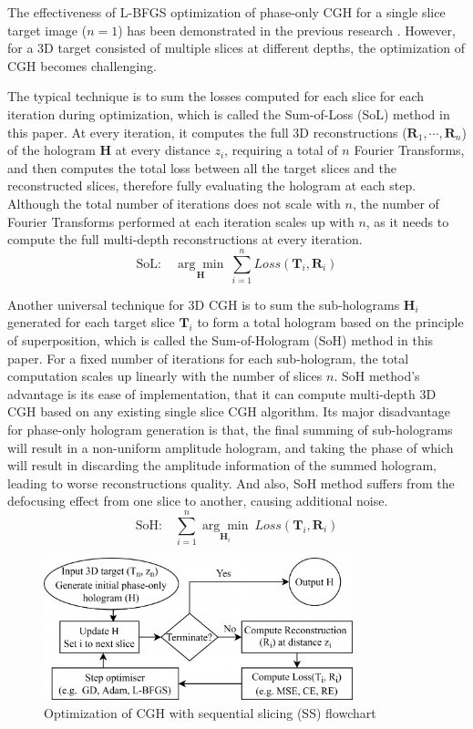 The effectiveness of L-BFGS optimization of phase-only CGH for a single slice target image ($n=1$) has been demonstrated in the previous research \cite{Sha2022}. However, for a 3D target consisted of multiple slices at different depths, the optimization of CGH becomes challenging.

The typical technique is to sum the losses computed for each slice for each iteration during optimization, which is called the Sum-of-Loss (SoL) method in this paper. At every iteration, it computes the full 3D reconstructions ($\textbf{R}_1, \cdots, \textbf{R}_n$) of the hologram $\textbf{H}$ at every distance $z_i$, requiring a total of $n$ Fourier Transforms, and then computes the total loss between all the target slices and the reconstructed slices, therefore fully evaluating the hologram at each step. Although the total number of iterations does not scale with $n$, the number of Fourier Transforms performed at each iteration scales up with $n$, as it needs to compute the full multi-depth reconstructions at every iteration.
\begin{equation}
	\text{SoL:}\quad \underset{\textbf{H}}{\arg \min}\ \sum_{i = 1}^{n} Loss(\textbf{T}_i, \textbf{R}_i)
\end{equation}

Another universal technique for 3D CGH is to sum the sub-holograms $\textbf{H}_i$ generated for each target slice $\textbf{T}_i$ to form a total hologram based on the principle of superposition, which is called the Sum-of-Hologram (SoH) method in this paper. For a fixed number of iterations for each sub-hologram, the total computation scales up linearly with the number of slices $n$. SoH method's advantage is its ease of implementation, that it can compute multi-depth 3D CGH based on any existing single slice CGH algorithm. Its major disadvantage for phase-only hologram generation is that, the final summing of sub-holograms will result in a non-uniform amplitude hologram, and taking the phase of which will result in discarding the amplitude information of the summed hologram, leading to worse reconstructions quality. And also, SoH method suffers from the defocusing effect from one slice to another, causing additional noise.
\begin{equation}
	\text{SoH:}\quad \sum_{i = 1}^{n} \underset{\textbf{H}_i}{\arg \min}\ Loss(\textbf{T}_i, \textbf{R}_i)
\end{equation}

\begin{figure}[h!]
	\centering
	\includegraphics[width=0.8\textwidth]{optim3d-cgh-flowchart}
	\caption{Optimization of CGH with sequential slicing (SS) flowchart}
	\label{fig:optim3d-cgh-flowchart}
\end{figure}

